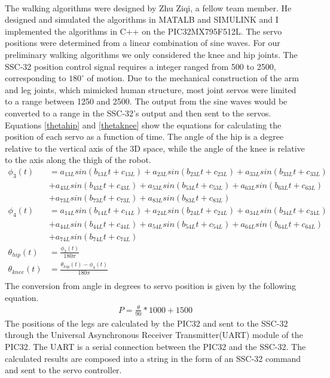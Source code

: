 \documentclass[titlepage,letterpaper,12pt]{article}
\begin{document}
\paragraph{} The walking algorithms were designed by Zhu Ziqi, a fellow team
member. He designed and simulated the algorithms in MATALB and SIMULINK and I
implemented the algorithms in C++ on the PIC32MX795F512L. The servo positions
were determined from a linear combination of sine waves. For our preliminary
walking algorithms we only considered the knee and hip joints. The SSC-32
position control signal requires a integer ranged from 500 to 2500,
corresponding to $180^{\circ}$ of motion\cite{sscdata}. Due to the mechanical
construction of the arm and leg joints, which mimicked human structure, most
joint servos were limited to a range between 1250 and 2500. The output from the
sine waves would be converted to a range in the SSC-32's output and then sent to
the servos. Equations \ref{thetahip} and \ref{thetaknee} show the equations for
calculating the position of each servo as a function of time. The angle of the
hip is a degree relative to the vertical axis of the 3D space, while the angle
of the knee is relative to the axis along the thigh of the robot.
\begin{align}
    \phi_{3}(t)&=a_{13L}sin(b_{13L}t+c_{13L})+a_{23L}sin(b_{23L}t+c_{23L})+a_{33L}sin(b_{33L}t+c_{33L})\nonumber\\
    &+a_{43L}sin(b_{43L}t+c_{43L})+a_{53L}sin(b_{53L}t+c_{53L})+a_{63L}sin(b_{63L}t+c_{63L})\nonumber\\
    &+a_{73L}sin(b_{73L}t+c_{73L})+a_{83L}sin(b_{83L}t+c_{83L}) \label{phi3}\\
    \phi_{4}(t)&=a_{14L}sin(b_{14L}t+c_{14L})+a_{24L}sin(b_{24L}t+c_{24L})+a_{34L}sin(b_{34L}t+c_{34L})\nonumber\\
    &+a_{44L}sin(b_{44L}t+c_{44L})+a_{54L}sin(b_{54L}t+c_{54L})+a_{64L}sin(b_{64L}t+c_{64L})\nonumber\\
    &+a_{74L}sin(b_{74L}t+c_{74L}) \label{phi4}\\
    \theta_{hip}(t)&=\frac{\phi_{3}(t)}{180\pi} \label{thetahip}\\
    \theta_{knee}(t)&=\frac{\theta_{hip}(t)-\phi_{4}(t)}{180\pi} \label{thetaknee}\\
\end{align}
The conversion from angle in degrees to servo position is given by the following
equation.
\begin{align}
    P=\frac{\theta}{90}*1000+1500
\end{align}
The positions of the legs are calculated by the PIC32 and sent to the SSC-32
through the Universal Asynchronous Receiver Transmitter(UART) module of the
PIC32. The UART is a serial connection between the PIC32 and the SSC-32. The
calculated results are composed into a string in the form of an SSC-32 command
and sent to the servo controller. 
\end{document}

